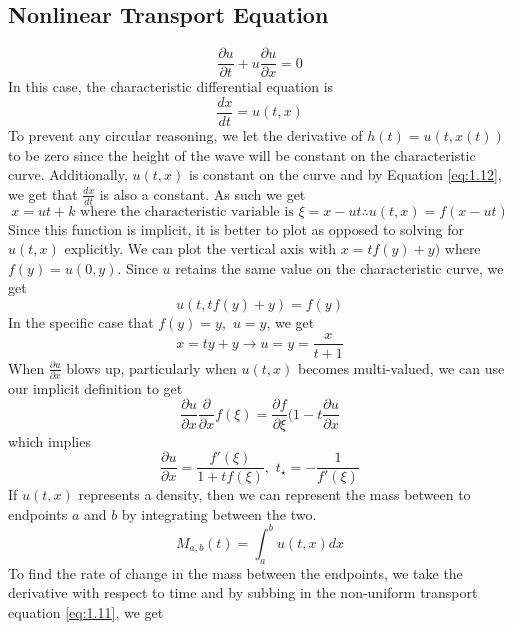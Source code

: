 \documentclass{article}
\newcommand{\pd}[2]{\frac{\partial #1}{\partial #2}}
\newcommand{\od}[2]{\frac{d #1}{d #2}}
\numberwithin{equation}{section}
\begin{document}
\subsection{Nonlinear Transport Equation}
\begin{equation}
    \pd{u}{t} + u\pd{u}{x} = 0 \label{eq:1.11}
\end{equation}
In this case, the characteristic differential equation is 
\begin{equation}
    \od{x}{t} = u(t,x) \label{eq:1.12}
\end{equation}
To prevent any circular reasoning, we let the derivative of $h(t) = u(t,x(t))$ to be zero since the height of the wave will be constant on the characteristic curve. Additionally, $u(t,x)$ is constant on the curve and by Equation \eqref{eq:1.12}, we get that $\od{x}{t}$ is also a constant. As such we get 
\begin{equation*}
    x=ut+k \text{ where the characteristic variable is }\xi=x-ut \therefore u(t,x)=f(x-ut)
\end{equation*}
Since this function is implicit, it is better to plot as opposed to solving for $u(t,x)$ explicitly. We can plot the vertical axis with $x = tf(y)+y)$ where $f(y) = u(0,y)$. Since $u$ retains the same value on the characteristic curve, we get 
\begin{equation*}
    u(t,tf(y)+y) = f(y)
\end{equation*}
In the specific case that $f(y) = y, \hspace{4pt} u=y$, we get 
\begin{equation*}
    x=ty+y \rightarrow u=y=\frac{x}{t+1}
\end{equation*}
When $\pd{u}{x}$ blows up, particularly when $u(t,x)$ becomes multi-valued, we can use our implicit definition to get 
\begin{equation*}
    \pd{u}{x} \frac{\partial}{\partial x}f(\xi) = \pd{f}{\xi}(1-t\pd{u}{x}
\end{equation*}
which implies 
\begin{equation}
    \pd{u}{x} = \frac{f'(\xi)}{1+tf(\xi)}, \hspace{4pt} t_{\star} = -\frac{1}{f'(\xi)}
\end{equation}
If $u(t,x)$ represents a density, then we can represent the mass between to endpoints $a$ and $b$ by integrating between the two.
\begin{equation*}
    M_{a,b}(t) = \int^b_au(t,x)dx
\end{equation*}
To find the rate of change in the mass between the endpoints, we take the derivative with respect to time and by subbing in the non-uniform transport equation \eqref{eq:1.11}, we get 
\end{document}
